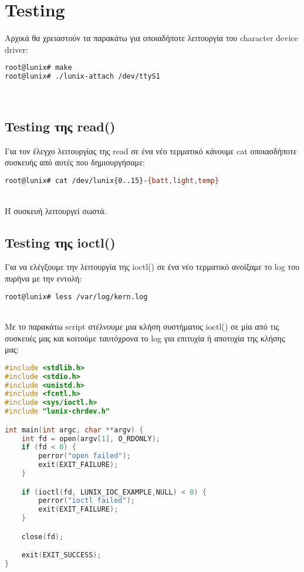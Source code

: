 \documentclass{article}
\begin{document}
\section{Testing}
Αρχικά θα χρειαστούν τα παρακάτω για οποιαδήποτε λειτουργία του character device driver: \\

\begin{lstlisting}[language=Bash]
root@lunix# make
root@lunix# ./lunix-attach /dev/ttyS1
\end{lstlisting}  \\

\subsection{Testing της read()}
Για τον έλεγχο λειτουργίας της read σε ένα νέο τερματικό κάνουμε cat οποιασδήποτε συσκευής από αυτές 
που δημιουργήσαμε: \\

\begin{lstlisting}[language=bash]
root@lunix# cat /dev/lunix{0..15}-{batt,light,temp}
\end{lstlisting}  \\

Η συσκευή λειτουργεί σωστά. \\

\subsection{Testing της ioctl()}
Για να ελέγξουμε την λειτουργία της ioctl() σε ένα νέο τερματικό ανοίξαμε το log του πυρήνα με την
εντολή: \\

\begin{lstlisting}[language=bash]
root@lunix# less /var/log/kern.log
\end{lstlisting}  \\

Με το παρακάτω script στέλνουμε μια κλήση συστήματος ioctl() σε μία από τις συσκευές μας και κοιτούμε
ταυτόχρονα το log για επιτυχία ή αποτυχία της κλήσης μας: \\

\begin{lstlisting}[language=C]
#include <stdlib.h> 
#include <stdio.h>
#include <unistd.h>
#include <fcntl.h>
#include <sys/ioctl.h>
#include "lunix-chrdev.h"

int main(int argc, char **argv) {
    int fd = open(argv[1], O_RDONLY);
	if (fd < 0) {
		perror("open failed");
		exit(EXIT_FAILURE);
	}

	if (ioctl(fd, LUNIX_IOC_EXAMPLE,NULL) < 0) {
		perror("ioctl failed");
		exit(EXIT_FAILURE);
	}

	close(fd);

	exit(EXIT_SUCCESS);
}

\end{lstlisting}  \\
\end{document}
